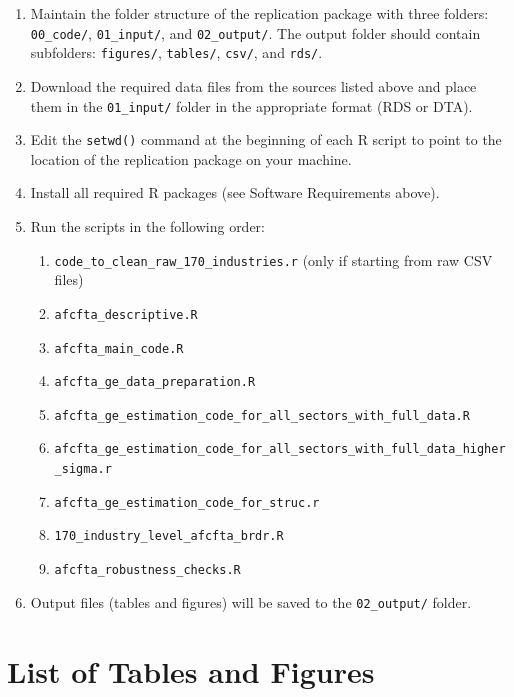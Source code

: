 \documentclass[12pt]{article}
\begin{document}
\begin{enumerate}
	\item Maintain the folder structure of the replication package with three folders: \texttt{00\_code/}, \texttt{01\_input/}, and \texttt{02\_output/}. The output folder should contain subfolders: \texttt{figures/}, \texttt{tables/}, \texttt{csv/}, and \texttt{rds/}.
	
	\item Download the required data files from the sources listed above and place them in the \texttt{01\_input/} folder in the appropriate format (RDS or DTA).
	
	\item Edit the \texttt{setwd()} command at the beginning of each R script to point to the location of the replication package on your machine.
	
	\item Install all required R packages (see Software Requirements above).
	
	\item Run the scripts in the following order:
	\begin{enumerate}
		\item \texttt{code\_to\_clean\_raw\_170\_industries.r} (only if starting from raw CSV files)
		\item \texttt{afcfta\_descriptive.R}
		\item \texttt{afcfta\_main\_code.R}
		\item \texttt{afcfta\_ge\_data\_preparation.R}
		\item \texttt{afcfta\_ge\_estimation\_code\_for\_all\_sectors\_with\_full\_data.R}
		\item \texttt{afcfta\_ge\_estimation\_code\_for\_all\_sectors\_with\_full\_data\_higher\_sigma.r}
		\item \texttt{afcfta\_ge\_estimation\_code\_for\_struc.r}
		\item \texttt{170\_industry\_level\_afcfta\_brdr.R}
		\item \texttt{afcfta\_robustness\_checks.R}
	\end{enumerate}
	
	\item Output files (tables and figures) will be saved to the \texttt{02\_output/} folder.
\end{enumerate}

\section{List of Tables and Figures}
\end{document}
